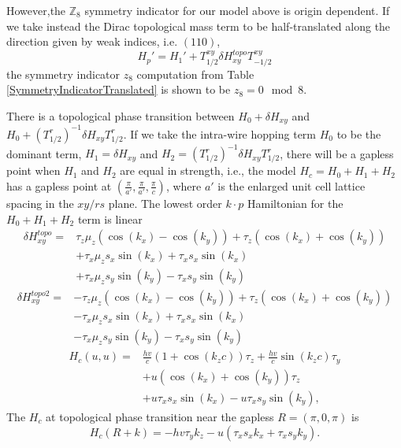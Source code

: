 However,the $\mathbb{Z}_8$ symmetry indicator for our model above is origin dependent. If we take instead the Dirac topological mass term to be half-translated along the direction given by weak indices, i.e. $(110)$,
\begin{equation}\label{eq:shift_origin}
    H_p' = H_1'+T_{1/2}^{xy}\delta H_{xy}^{topo}T_{-1/2}^{xy}
\end{equation} the symmetry indicator $z_8$ computation from Table \ref{SymmetryIndicatorTranslated} is shown to be $z_8 = 0 \mod 8$. %

There is a topological phase transition between $H_0 + \delta H_{xy}$ and $H_0 + (T_{1/2}^{r})^{-1} \delta H_{xy} T_{1/2}^r$. If we take the intra-wire hopping term $H_0$ to be the dominant term, $H_1 = \delta H_{xy}$ and $H_2 = (T_{1/2}^{r})^{-1} \delta H_{xy} T_{1/2}^r$, there will be a gapless point when $H_1$ and $H_2$ are equal in strength, i.e., the model $H_c = H_0 + H_1 + H_2$ has a gapless point at $(\frac{\pi}{a'}, \frac{\pi}{a'}, \frac{\pi}{c})$, where $a'$ is the enlarged unit cell lattice spacing in the $xy/rs$ plane. The lowest order $k \cdot p$ Hamiltonian for the $H_0 + H_1 + H_2$ term is linear 
\begin{equation}
\begin{aligned}
\delta H_{xy}^{topo} = &  \tau_z\mu_z (\cos (k_x)-\cos (k_y))+
\tau_z(\cos (k_x)+\cos (k_y))\\&+\tau
_x\mu_zs_x \sin (k_x)+ \tau_xs_x \sin
(k_x)\\&+ \tau_x\mu_zs_y\sin (k_y)-
\tau_xs_y \sin (k_y)
\end{aligned}
\end{equation}
\begin{equation}
\begin{aligned}
\delta H_{xy}^{topo2} = &  -\tau_z\mu_z (\cos (k_x)-\cos (k_y))+
\tau_z(\cos (k_x)+\cos (k_y))\\&-\tau
_x\mu_zs_x \sin (k_x)+ \tau_xs_x \sin
(k_x)\\&- \tau_x\mu_zs_y\sin (k_y)-
\tau_xs_y \sin (k_y)
\end{aligned}
\end{equation}
\begin{equation}
    \begin{aligned}
    H_c(u,u)=&\frac{hv}{c}(1+\cos(k_zc))\tau_z+\frac{hv}{c}\sin(k_zc)\tau_y\\
&+u(\cos(k_x)+\cos(k_y))\tau_z\\
&+u\tau_xs_x\sin(k_x) -u\tau_xs_y\sin(k_y)
 ,\end{aligned}
\end{equation}
The $H_c$ at topological phase transition near the gapless $R=(\pi,0,\pi)$ is
\begin{equation}         H_c(R+k)=-hv\tau_yk_z-u(\tau_xs_xk_x+\tau_xs_yk_y) .
\end{equation}

